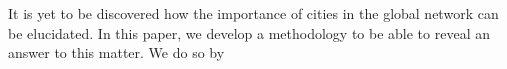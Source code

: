 It is yet to be discovered how the importance of cities in the global network can be elucidated. In this paper, we develop a methodology to be able to reveal an answer to this matter. We do so by 